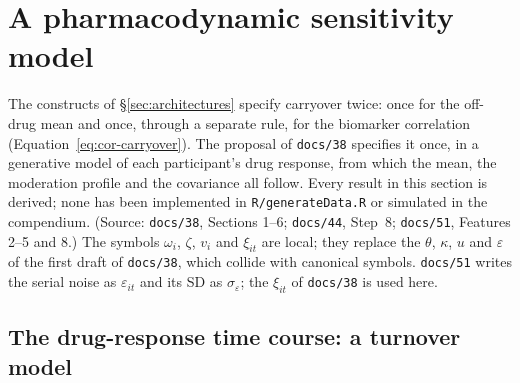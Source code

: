 \documentclass[11pt]{article}
\newcommand{\code}[1]{\texttt{#1}}
\begin{document}
\section{A pharmacodynamic sensitivity model}
\label{sec:pd-model}

The constructs of \S\ref{sec:architectures} specify carryover twice:
once for the off-drug mean and once, through a separate rule, for the
biomarker correlation (Equation~\eqref{eq:cor-carryover}). The
proposal of \code{docs/38} specifies it once, in a generative model of
each participant's drug response, from which the mean, the moderation
profile and the covariance all follow. Every result in this section
is derived; none has been implemented in \code{R/generateData.R} or
simulated in the compendium. (Source: \code{docs/38}, Sections 1--6;
\code{docs/44}, Step~8; \code{docs/51}, Features 2--5 and 8.) The
symbols $\omega_i$, $\zeta$, $v_i$ and $\xi_{it}$ are local; they
replace the $\theta$, $\kappa$, $u$ and $\varepsilon$ of the first
draft of \code{docs/38}, which collide with canonical symbols.
\code{docs/51} writes the serial noise as $\varepsilon_{it}$ and its
SD as $\sigma_\varepsilon$; the $\xi_{it}$ of \code{docs/38} is used
here.

\subsection{The drug-response time course: a turnover model}
\end{document}
